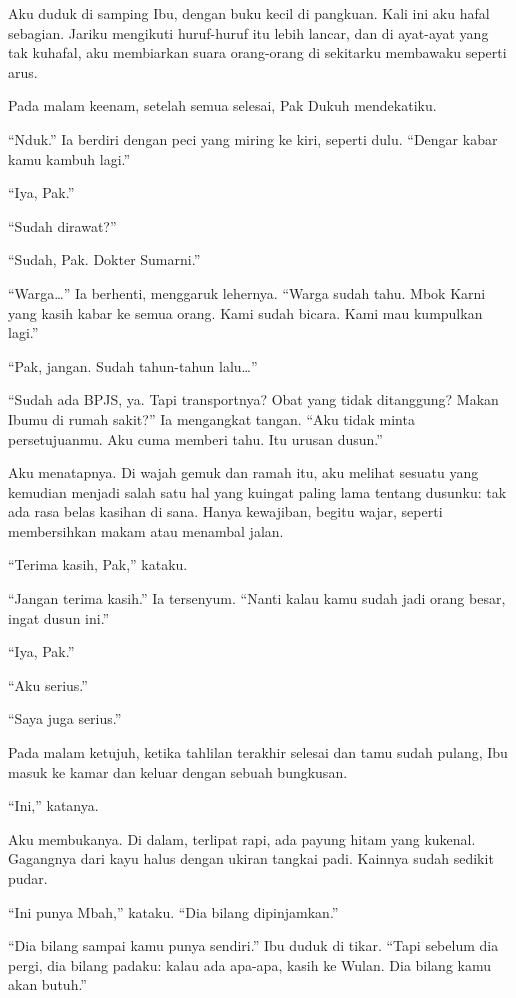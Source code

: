 \documentclass[11pt,twoside,openany]{book}
\makeatletter
\newcommand{\scenebreak}{\par\vspace{0.9em}{\centering\textsc{*\hspace{0.7em}*\hspace{0.7em}*}\par}\vspace{0.9em}\@afterindentfalse\@afterheading}
\makeatother
\begin{document}
Aku duduk di samping Ibu, dengan buku kecil di pangkuan. Kali ini aku hafal sebagian. Jariku mengikuti huruf-huruf itu lebih lancar, dan di ayat-ayat yang tak kuhafal, aku membiarkan suara orang-orang di sekitarku membawaku seperti arus.

Pada malam keenam, setelah semua selesai, Pak Dukuh mendekatiku.

``Nduk.'' Ia berdiri dengan peci yang miring ke kiri, seperti dulu. ``Dengar kabar kamu kambuh lagi.''

``Iya, Pak.''

``Sudah dirawat?''

``Sudah, Pak. Dokter Sumarni.''

``Warga\ldots{}'' Ia berhenti, menggaruk lehernya. ``Warga sudah tahu. Mbok Karni yang kasih kabar ke semua orang. Kami sudah bicara. Kami mau kumpulkan lagi.''

``Pak, jangan. Sudah tahun-tahun lalu\ldots{}''

``Sudah ada BPJS, ya. Tapi transportnya? Obat yang tidak ditanggung? Makan Ibumu di rumah sakit?'' Ia mengangkat tangan. ``Aku tidak minta persetujuanmu. Aku cuma memberi tahu. Itu urusan dusun.''

Aku menatapnya. Di wajah gemuk dan ramah itu, aku melihat sesuatu yang kemudian menjadi salah satu hal yang kuingat paling lama tentang dusunku: tak ada rasa belas kasihan di sana. Hanya kewajiban, begitu wajar, seperti membersihkan makam atau menambal jalan.

``Terima kasih, Pak,'' kataku.

``Jangan terima kasih.'' Ia tersenyum. ``Nanti kalau kamu sudah jadi orang besar, ingat dusun ini.''

``Iya, Pak.''

``Aku serius.''

``Saya juga serius.''

\scenebreak
Pada malam ketujuh, ketika tahlilan terakhir selesai dan tamu sudah pulang, Ibu masuk ke kamar dan keluar dengan sebuah bungkusan.

``Ini,'' katanya.

Aku membukanya. Di dalam, terlipat rapi, ada payung hitam yang kukenal. Gagangnya dari kayu halus dengan ukiran tangkai padi. Kainnya sudah sedikit pudar.

``Ini punya Mbah,'' kataku. ``Dia bilang dipinjamkan.''

``Dia bilang sampai kamu punya sendiri.'' Ibu duduk di tikar. ``Tapi sebelum dia pergi, dia bilang padaku: kalau ada apa-apa, kasih ke Wulan. Dia bilang kamu akan butuh.''
\end{document}
